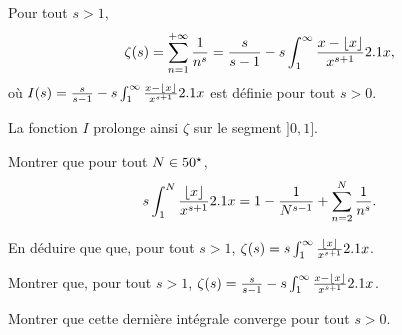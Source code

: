 \begin{comment}
        \item Soit $x > 0$. Calculons $\Gamma(x+1)$ en effectuant une intégration par parties. Posons $u:t \mapsto \e^{-t}$ et $v:t \mapsto t^x$, toutes deux de classe $\mathscr{C}^1$ sur $\Rp$. Vérifions la convergence du \emph{crochet}:
        \begin{align*}
            \text{par croissances comparées} \quad & \lim_{t \to +\infty} u(t) v(t) = 0, \\
            \text{ comme } x > 0 \quad & \lim_{t \to 0} u(t) v(t) = 0.
        \end{align*}
        Ainsi, d'après le théorème d'intégration par parties généralisées, 
        $$\int_{0}^{+\infty} t^{x-1} \e^{-t} \d t = \underbrace{0}_{\mathclap{\text{crochet}}} - \int_{0}^{+\infty} xt^{x-1} (-\e^{-t}) \d t.$$
        soit 
        $$\Gamma(x+1) = x \Gamma(x).$$
        En particulier, $\Gamma(1) = 1$ et pour tout $n \in \Ne, \Gamma(n+1) = n \Gamma(n)$. Donc
        $$\forall n \in \Ne, \Gamma(n+1) = n!$$
    \end{itemize}
\end{demo}
\end{comment}


\label{subsec:fonctionZeta}

\begin{theo}
Pour tout $s > 1$,
\[
\zeta(s)
= \sum_{n=1}^{+\infty} \frac{1}{n^s}
= \frac{s}{s - 1} - s \int_1^\infty \frac{x - \lfloor x\rfloor}{x^{s+1}} 2.1 x,
\]
où $I(s) = \frac{s}{s - 1} - s \int_1^\infty \frac{x - \lfloor x\rfloor}{x^{s+1}} 2.1 x$ est définie pour tout $s > 0$.

La fonction $I$ prolonge ainsi $\zeta$ sur le segment $]0, 1]$.
\end{theo}

\begin{exercice}
\begin{questions}
\item Montrer que pour tout $N \in 50^\star$,
\[
s \int_1^N \frac{\lfloor x\rfloor}{x^{s+1}} 2.1 x
= 1 - \frac{1}{N^{s-1}} + \sum_{n=2}^N \frac{1}{n^s}.
\]

\item En déduire que que, pour tout $s > 1$, $\zeta(s) = s \int_1^\infty \frac{\lfloor x\rfloor}{x^{s + 1}} 2.1 x$.

\item Montrer que, pour tout $s > 1$, $\zeta(s) = \frac{s}{s - 1} - s \int_1^\infty \frac{x - \lfloor x\rfloor}{x^{s+1}} 2.1 x$.

\item Montrer que cette dernière intégrale converge pour tout $s > 0$.
\end{questions}
\end{exercice}

